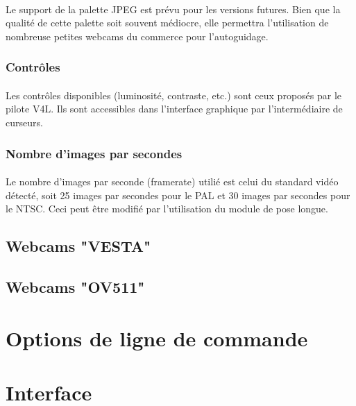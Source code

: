 \documentclass[11pt,a4paper]{book}
\begin{document}
\paragraph*{}
Le support de la palette JPEG est pr\'evu pour les versions futures. Bien que la qualit\'e
de cette palette soit souvent m\'ediocre, elle permettra l'utilisation de nombreuse petites
webcams du commerce pour l'autoguidage.

\subsubsection{Contr\^oles}

\paragraph*{}
Les contr\^oles disponibles (luminosit\'e, contraste, etc.) sont ceux propos\'es par le pilote
V4L. Ils sont accessibles dans l'interface graphique par l'interm\'ediaire de curseurs.

\subsubsection{Nombre d'images par secondes}

\paragraph*{}
Le nombre d'images par seconde (framerate) utili\'e est celui du standard vid\'eo d\'etect\'e,
soit 25 images par secondes pour le PAL et 30 images par secondes pour le NTSC. Ceci peut \^etre
modifi\'e par l'utilisation du module de pose longue.  

\subsection{Webcams "VESTA"}

\subsection{Webcams "OV511"}

\section{Options de ligne de commande}

\section{Interface}
\end{document}
